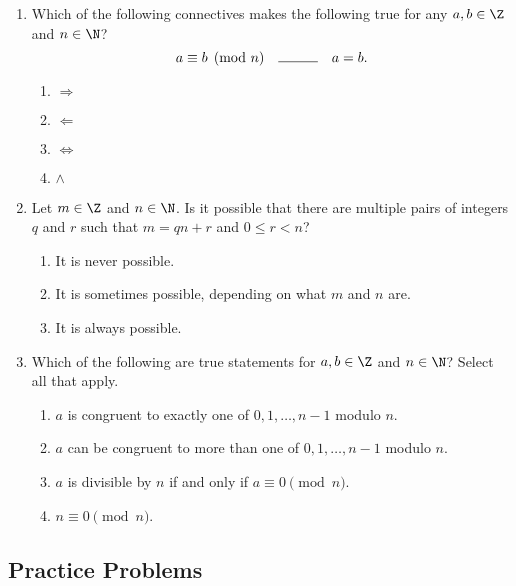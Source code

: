 \begin{enumerate}
    \item Which of the following connectives makes the following true for any $a,b \in \Z$ and $n \in \N$?
    \[
        a \equiv b \pmod n \quad \rule{1cm}{0.15mm} \quad a = b.
    \]
    \begin{enumerate}
        \item $\Longrightarrow$
        \item $\Longleftarrow$
        \item $\iff$
        \item $\land$
    \end{enumerate}
    
    \item Let $m \in \Z$ and $n \in \N$. Is it possible that there are multiple pairs of integers $q$ and $r$ such that $m = qn + r$ and $0 \leq r < n$?
    \begin{enumerate}
        \item It is never possible.
        \item It is sometimes possible, depending on what $m$ and $n$ are.
        \item It is always possible.
    \end{enumerate}
    
    \item Which of the following are true statements for $a,b \in \Z$ and $n \in \N$? Select all that apply.
    \begin{enumerate}
        \item $a$ is congruent to exactly one of $0,1,\ldots,n-1$ modulo $n$.
        \item $a$ can be congruent to more than one of $0,1,\ldots,n-1$ modulo $n$.
        \item $a$ is divisible by $n$  if and only if $a \equiv 0 \pmod n$.
        \item $n \equiv 0 \pmod n$.
    \end{enumerate}
\end{enumerate}

\subsection*{Practice Problems}

